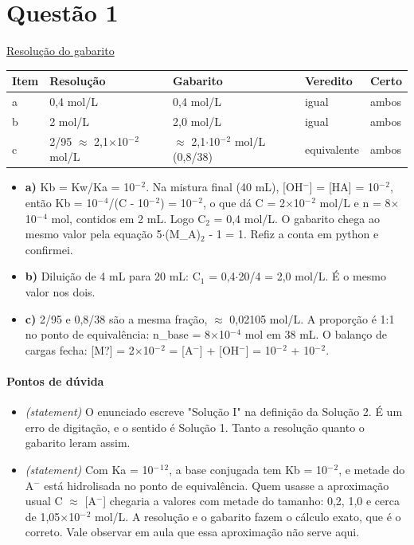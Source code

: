 \documentclass{article}%
\begin{document}
\section*{Questão 1}%
\href{https://poliedroresolve.sistemapoliedro.com.br/vestibulares/ita/2026/ita-2-fase-dia-2-29-10-2025-2-fase-dia-2/dissertativa-1-quimica-2-fase-dia-2-ita-2026}{Resolução do gabarito}\par\smallskip%
\begin{longtable}{@{}p{} p{} p{} p{} p{}@{}}\toprule Item & Resolução & Gabarito & Veredito & Certo \\ \midrule
a & 0,4 mol/L & 0,4 mol/L & igual & ambos \\
b & 2 mol/L & 2,0 mol/L & igual & ambos \\
c & 2/95 $\approx$ 2,1$\times$10$^{-}$$^2$ mol/L & $\approx$ 2,1$\cdot$10$^{-}$$^2$ mol/L (0,8/38) & equivalente & ambos \\
\bottomrule\end{longtable}%
\begin{itemize}%
\item%
\textbf{a)} Kb = Kw/Ka = 10$^{-}$$^2$. Na mistura final (40 mL), {[}OH$^{-}${]} = {[}HA{]} = 10$^{-}$$^2$, então Kb = 10$^{-}$$^{4}$/(C - 10$^{-}$$^2$) = 10$^{-}$$^2$, o que dá C = 2$\times$10$^{-}$$^2$ mol/L e n = 8$\times$10$^{-}$$^{4}$ mol, contidos em 2 mL. Logo C$_{2}$ = 0,4 mol/L. O gabarito chega ao mesmo valor pela equação 5$\cdot$(M\_A)$_{2}$ - 1 = 1. Refiz a conta em python e confirmei.%
\item%
\textbf{b)} Diluição de 4 mL para 20 mL: C$_{1}$ = 0,4$\cdot$20/4 = 2,0 mol/L. É o mesmo valor nos dois.%
\item%
\textbf{c)} 2/95 e 0,8/38 são a mesma fração, $\approx$ 0,02105 mol/L. A proporção é 1:1 no ponto de equivalência: n\_base = 8$\times$10$^{-}$$^{4}$ mol em 38 mL. O balanço de cargas fecha: {[}M?{]} = 2$\times$10$^{-}$$^2$ = {[}A$^{-}${]} + {[}OH$^{-}${]} = 10$^{-}$$^2$ + 10$^{-}$$^2$.%
\end{itemize}%
\paragraph{Pontos de dúvida}%
\begin{itemize}%
\item%
\textit{(statement)} O enunciado escreve "Solução I" na definição da Solução 2. É um erro de digitação, e o sentido é Solução 1. Tanto a resolução quanto o gabarito leram assim.%
\item%
\textit{(statement)} Com Ka = 10$^{-}$$^{1}$$^2$, a base conjugada tem Kb = 10$^{-}$$^2$, e metade do A$^{-}$ está hidrolisada no ponto de equivalência. Quem usasse a aproximação usual C $\approx$ {[}A$^{-}${]} chegaria a valores com metade do tamanho: 0,2, 1,0 e cerca de 1,05$\times$10$^{-}$$^2$ mol/L. A resolução e o gabarito fazem o cálculo exato, que é o correto. Vale observar em aula que essa aproximação não serve aqui.%
\end{itemize}%
\end{document}
